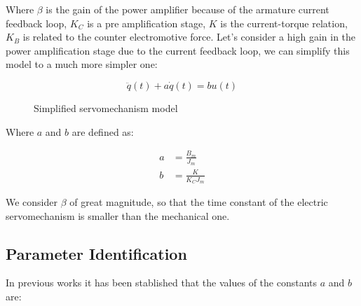 \documentclass[journal]{IEEEtran}
\begin{document}
        Where $\beta$ is the gain of the power amplifier because of the armature current feedback loop, $K_C$ is a pre amplification stage, $K$ is the current-torque relation, $K_B$ is related to the counter electromotive force. Let's consider a high gain in the power amplification stage due to the current feedback loop, we can simplify this model\cite{Ogata:2001:MCE:516039} to a much more simpler one:

        \begin{equation} \label{servolineal}
            \ddot{q}(t) + a \dot{q}(t) = b u(t)
        \end{equation}

        \begin{figure}[h]
            \begin{center}
            \end{center}
            \caption{Simplified servomechanism model}
            \label{fig_simpleservomodel}
        \end{figure}

        Where $a$ and $b$ are defined as:

        \begin{align}
            a &= \frac{B_m}{J_m} \\
            b &= \frac{K}{K_C J_m}
        \end{align}

        We consider $\beta$ of great magnitude, so that the time constant of the electric servomechanism is smaller than the mechanical one.
        
    \subsection{Parameter Identification}

        In previous works it has been stablished that the values of the constants $a$ and $b$\cite{Moctezuma2011} are:
\end{document}
